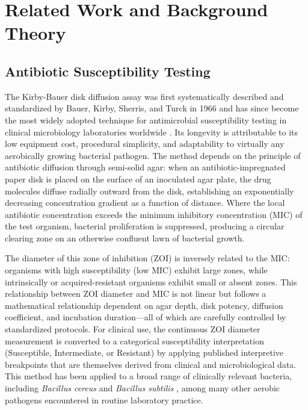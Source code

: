 \chapter{Related Work and Background Theory}

\section{Antibiotic Susceptibility Testing}

The Kirby-Bauer disk diffusion assay was first systematically described and standardized by
Bauer, Kirby, Sherris, and Turck in 1966 and has since become the most widely adopted technique
for antimicrobial susceptibility testing in clinical microbiology laboratories worldwide
\cite{asm2009kirby,clsi2025}. Its longevity is attributable to its low equipment cost, procedural simplicity,
and adaptability to virtually any aerobically growing bacterial pathogen. The method depends on
the principle of antibiotic diffusion through semi-solid agar: when an antibiotic-impregnated
paper disk is placed on the surface of an inoculated agar plate, the drug molecules diffuse
radially outward from the disk, establishing an exponentially decreasing concentration gradient
as a function of distance. Where the local antibiotic concentration exceeds the minimum
inhibitory concentration (MIC) of the test organism, bacterial proliferation is suppressed,
producing a circular clearing zone on an otherwise confluent lawn of bacterial growth.

The diameter of this zone of inhibition (ZOI) is inversely related to the MIC: organisms with
high susceptibility (low MIC) exhibit large zones, while intrinsically or acquired-resistant
organisms exhibit small or absent zones. This relationship between ZOI diameter and MIC is not
linear but follows a mathematical relationship dependent on agar depth, disk potency, diffusion
coefficient, and incubation duration---all of which are carefully controlled by standardized
protocols. For clinical use, the continuous ZOI diameter measurement is converted to a categorical
susceptibility interpretation (Susceptible, Intermediate, or Resistant) by applying published
interpretive breakpoints that are themselves derived from clinical and microbiological data.
This method has been applied to a broad range of clinically relevant bacteria, including
\textit{Bacillus cereus} \cite{fitwi2020} and \textit{Bacillus subtilis} \cite{jiang2023},
among many other aerobic pathogens encountered in routine laboratory practice.

